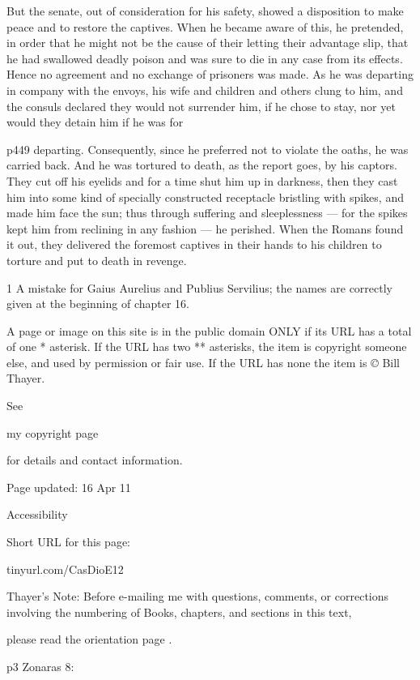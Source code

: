 But the senate, out of consideration for his safety, showed a disposition to make peace and to restore the captives. When he became aware of this, he pretended, in order that he might not be the cause of their letting their advantage slip, that he had swallowed deadly poison and was sure to die in any case from its effects. Hence no agreement and no exchange of prisoners was made. As he was departing in company with the envoys, his wife and children and others clung to him, and the consuls declared they would not surrender him, if he chose to stay, nor yet would they detain him if he was for

p449 departing. Consequently, since he preferred not to violate the oaths, he was carried back. And he was tortured to death, as the report goes, by his captors. They cut off his eyelids and for a time shut him up in darkness, then they cast him into some kind of specially constructed receptacle bristling with spikes, and made him face the sun; thus through suffering and sleeplessness \texthebrew{—} for the spikes kept him from reclining in any fashion \texthebrew{—} he perished. When the Romans found it out, they delivered the foremost captives in their hands to his children to torture and put to death in revenge.

1
A mistake for Gaius Aurelius and Publius Servilius; the names are correctly given at the beginning of chapter 16.

A page or image on this site is in the public domain ONLY if its URL has a total of one * asterisk. If the URL has two ** asterisks, the item is copyright someone else, and used by permission or fair use. If the URL has none the item is \emph{©} Bill Thayer.

See

my copyright page

for details and contact information.

Page updated:
16 Apr 11

Accessibility


Short URL for this page:

tinyurl.com/CasDioE12

Thayer's Note: Before e-mailing me with questions, comments, or corrections involving the numbering of Books, chapters, and sections in this text,

please read the orientation page .

p3
Zonaras 8:

